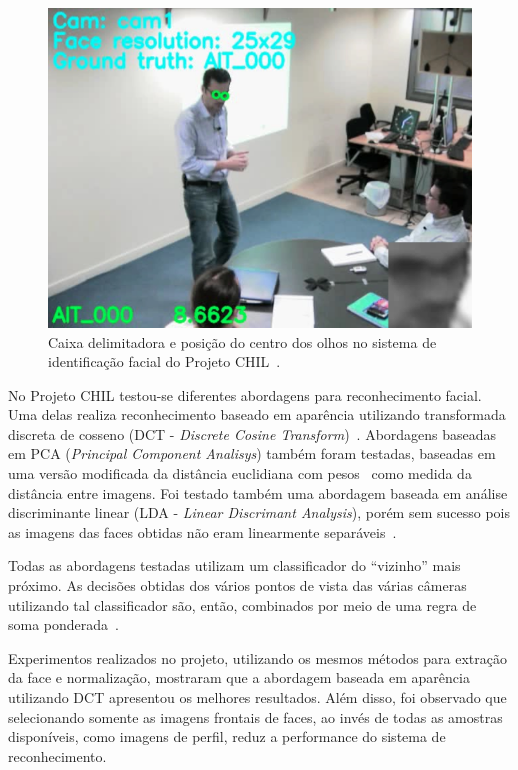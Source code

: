 	\begin{figure}[hbt]
		\begin{center}
			\includegraphics[scale=0.4]{figuras/3.TrabalhosCorrelatos/chil.png}
		\end{center}
		\caption{Caixa delimitadora e posição do centro dos olhos no sistema de identificação facial do Projeto CHIL~\cite{chil}.}
		\label{chilImage}
	\end{figure}


No Projeto CHIL testou-se diferentes abordagens para reconhecimento facial. Uma delas realiza reconhecimento baseado em aparência utilizando transformada discreta de cosseno (DCT - \textit{Discrete Cosine Transform})~\cite{chilref6, chilref7}. Abordagens baseadas em PCA (\textit{Principal Component Analisys}) também foram testadas, baseadas em uma versão modificada da distância euclidiana com pesos~\cite{chilref8, chilref9} como medida da distância entre imagens. Foi testado também uma abordagem baseada em análise discriminante linear (LDA - \textit{Linear Discrimant Analysis}), porém sem sucesso pois as imagens das faces obtidas não eram linearmente separáveis~\cite{chilref8, chilref9}. 

Todas as abordagens testadas utilizam um classificador do ``vizinho'' mais próximo. As decisões obtidas dos vários pontos de vista das várias câmeras utilizando tal classificador são, então, combinados por meio de uma regra de soma ponderada~\cite{chilref8, chilref9}.

Experimentos realizados no projeto, utilizando os mesmos métodos para extração da face e normalização, mostraram que a abordagem baseada em aparência utilizando DCT apresentou os melhores resultados. Além disso, foi observado que selecionando somente as imagens frontais de faces, ao invés de todas as amostras disponíveis, como imagens de perfil, reduz a performance do sistema de reconhecimento. 

